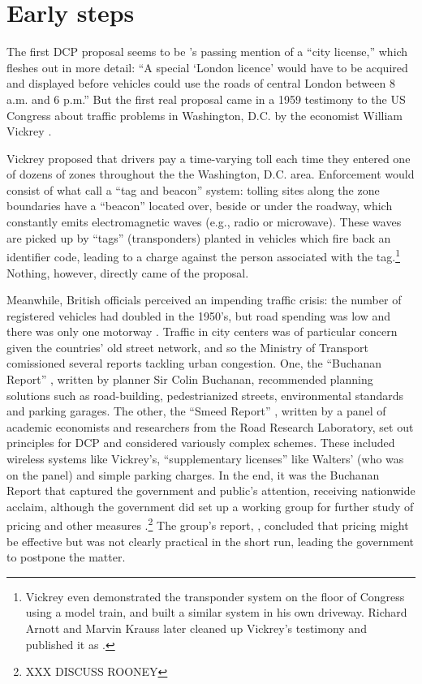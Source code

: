 \section{Early steps}\label{sec:early}

The first DCP proposal seems to be \citet{buchanan1952}'s passing mention of a ``city license,'' which \citet{Walters1954} fleshes out in more detail: ``A special `London licence' would have to be acquired and displayed before vehicles could use the roads of central London between 8 a.m. and 6 p.m.'' But the first real proposal came in a 1959 testimony to the US Congress about traffic problems in Washington, D.C. by the economist William Vickrey \citep{Vickrey1959}. 

Vickrey proposed that drivers pay a time-varying toll each time they entered one of dozens of zones throughout the the Washington, D.C. area. Enforcement would consist of what \citet{DePalma2011} call a ``tag and beacon'' system: tolling sites along the zone boundaries have a ``beacon'' located over, beside or under the roadway, which constantly emits electromagnetic waves (e.g., radio or microwave). These waves are picked up by ``tags'' (transponders) planted in vehicles which fire back an identifier code, leading to a charge against the person associated with the tag.\footnote{Vickrey even demonstrated the transponder system on the floor of Congress using a model train, and built a similar system in his own driveway. Richard Arnott and Marvin Krauss later cleaned up Vickrey's testimony and published it as \citet{Vickrey1994}.} Nothing, however, directly came of the proposal.

Meanwhile, British officials perceived an impending traffic crisis: the number of registered vehicles had doubled in the 1950's, but road spending was low and there was only one motorway \citep{Gunn2011,Hall2004}. Traffic in city centers was of particular concern given the countries' old street network, and so the Ministry of Transport comissioned several reports tackling urban congestion. One, the ``Buchanan Report'' \citep{MoT1963}, written by planner Sir Colin Buchanan, recommended planning solutions such as road-building, pedestrianized streets, environmental standards and parking garages. The other, the ``Smeed Report'' \citep{MoT1964}, written by a panel of academic economists and researchers from the Road Research Laboratory, set out principles for DCP and considered variously complex schemes. These included wireless systems like Vickrey's, ``supplementary licenses'' like Walters' (who was on the panel) and simple parking charges. In the end, it was the Buchanan Report that captured the government and public's attention, receiving nationwide acclaim, although the government did set up a working group for further study of pricing and other measures \citep{Rooney2014}.\footnote{XXX DISCUSS ROONEY} The group's report, \citet{MoT1967}, concluded that pricing might be effective but was not clearly practical in the short run, leading the government to postpone the matter. 

